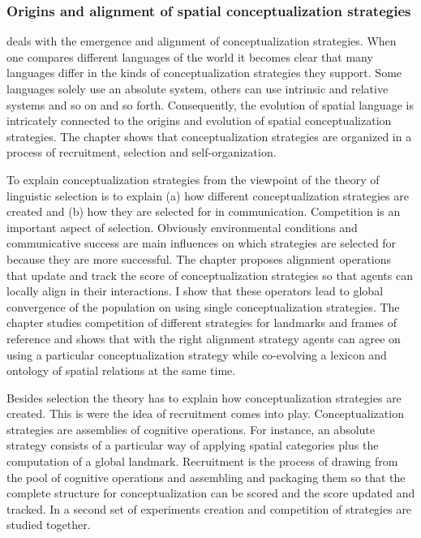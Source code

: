 \subsubsection{Origins and alignment of spatial conceptualization strategies}
 deals with the emergence and 
alignment of conceptualization strategies.
When one compares different languages of the world it becomes clear that many languages 
differ in the kinds of conceptualization strategies they support. Some languages 
solely use an absolute system, others can use intrinsic and relative systems and so on
and so forth. Consequently, the evolution of spatial language is intricately connected to the 
origins and evolution of spatial conceptualization strategies. The chapter shows that
conceptualization strategies are organized in a process of recruitment, selection and 
self-organization. 

To explain conceptualization strategies from the viewpoint of the theory of linguistic
selection is to explain (a) how different conceptualization strategies are created
and (b) how they are selected for in communication. Competition is an important aspect
of selection. Obviously environmental conditions and communicative success 
are main influences on which strategies are selected for because they are more successful. 
The chapter proposes alignment operations that update and track the score
of conceptualization strategies so that agents can locally align in their
interactions. I show that these operators lead to global convergence
of the population on using single conceptualization strategies.
The chapter studies competition of different strategies for landmarks and 
frames of reference and shows that with the right alignment strategy
agents can agree on using a particular conceptualization strategy while
co-evolving a lexicon and ontology of spatial relations at the same time.

Besides selection the theory has to explain how conceptualization
strategies are created. This is were the idea of recruitment comes into play.
Conceptualization strategies are assemblies of cognitive operations. For instance,
an absolute strategy consists of a particular way of applying spatial categories
plus the computation of a global landmark. Recruitment is the process
of drawing from the pool of cognitive operations and assembling and packaging
them so that the complete structure for conceptualization can be scored and 
the score updated and tracked. In a second set of experiments creation
and competition of strategies are studied together.

